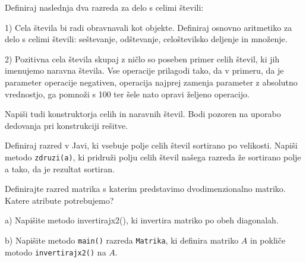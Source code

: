 \begin{ex}
Definiraj naslednja dva razreda za delo s celimi \v stevili:

1) Cela \v stevila bi radi obravnavali kot objekte. Definiraj osnovno aritmetiko za delo s celimi \v stevili: se\v stevanje, od\v stevanje, celo\v stevilsko deljenje in mno\v zenje.

2) Pozitivna cela \v stevila skupaj z ni\v clo so poseben primer celih \v stevil, ki jih imenujemo naravna \v stevila. Vse operacije prilagodi tako, da v primeru, da je parameter operacije negativen, operacija najprej zamenja parameter z absolutno vrednostjo, ga pomno\v zi s 100 ter \v sele nato opravi \v zeljeno operacijo.

Napi\v si tudi konstruktorja celih in naravnih \v stevil. Bodi pozoren na uporabo dedovanja pri konstrukciji re\v sitve.



\end{ex}
\begin{ex}
Definiraj razred v Javi, ki vsebuje polje celih \v stevil sortirano po velikosti. Napi\v si metodo \lstinline{zdruzi(a)}, ki pridru\v zi polju celih \v stevil na\v sega razreda \v ze sortirano polje a tako, da je rezultat sortiran.

\end{ex}
\begin{ex}
Definirajte razred matrika s katerim predstavimo dvodimenzionalno matriko. Katere atribute potrebujemo?

a) Napi\v site metodo invertirajx2(), ki invertira matriko po obeh diagonalah.

b) Napi\v site metodo \lstinline{main()} razreda \lstinline{Matrika}, ki definira matriko $A$ in pokli\v ce motodo \lstinline{invertirajx2()} na $A$.



\end{ex}
